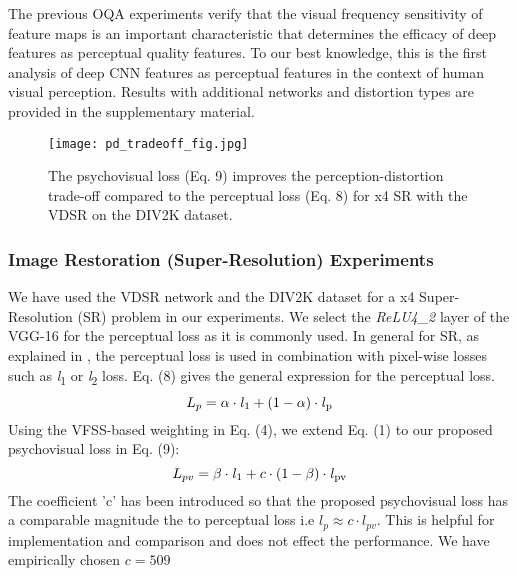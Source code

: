 \documentclass[10pt,twocolumn,letterpaper]{article}
\begin{document}
The previous OQA experiments verify that the visual frequency sensitivity of feature maps is an important characteristic that determines the efficacy of deep features as perceptual quality features. To our best knowledge, this is the first analysis of deep CNN features as perceptual features in the context of human visual perception. Results with additional networks and distortion types are provided in the supplementary material.
   
\begin{figure}[t!]
\texttt{[image: pd\_tradeoff\_fig.jpg]}
\caption{The psychovisual loss (Eq. 9) improves the perception-distortion trade-off compared to the perceptual loss (Eq. 8) for x4 SR with the VDSR on the DIV2K dataset.}
\end{figure}

\subsubsection{Image Restoration (Super-Resolution) Experiments}  
We have used the VDSR \cite{26} network and the DIV2K dataset \cite{27} for a x4 Super-Resolution (SR) problem in our experiments. We select the \textit{ReLU4\_2} layer of the VGG-16 for the perceptual loss as it is commonly used. In general for SR, as explained in \cite{7}, the perceptual loss \cite{7} is used in combination with pixel-wise losses such as \textit{l}\textsubscript{1} or \textit{l}\textsubscript{2} loss. Eq. (8) gives the general expression for the perceptual loss.
\begin{equation}
   L_{p} = \alpha\cdot\mathit{l}\textsubscript{1} + (1-\alpha)\cdot\mathit{l}\textsubscript{p}
\end{equation}
Using the VFSS-based weighting in Eq. (4), we extend Eq. (1) to our proposed psychovisual loss in Eq. (9):
\begin{equation}
  L_{pv} = \beta\cdot\mathit{l}\textsubscript{1} + c\cdot(1-\beta)\cdot\mathit{l}\textsubscript{pv}
\end{equation}
The coefficient 'c' has been introduced so that the proposed psychovisual loss has a comparable magnitude the to perceptual loss i.e $l_{p}\approx c\cdot l_{pv}$. This is helpful for implementation and comparison and does not effect the performance. We have empirically chosen $c=509$
\end{document}
